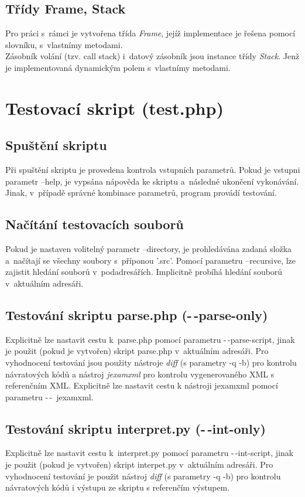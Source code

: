 \documentclass[a4paper, 10pt]{article}
\begin{document}
\subsection{Třídy Frame, Stack}
\qquad Pro práci s~rámci je vytvořena třída \emph{Frame}, jejíž implementace je řešena pomocí slovníku, s~vlastnímy metodami. \\
Zásobník volání (tzv. call stack) i~datový zásobník jsou instance třídy \emph{Stack}. Jenž je implementovaná dynamickým polem s~vlastnímy metodami. 


\newpage

\section{Testovací skript (test.php)}

\subsection{Spuštění skriptu}
\qquad Při spuštění skriptu je provedena kontrola vstupních parametrů. Pokud je vstupni parametr  --help, je vypsána nápověda ke skriptu a~následné ukončení vykonávání. Jinak, v~případě správné kombinace parametrů, program provádí testování.

\subsection{Načítání testovacích souborů}
\qquad Pokud je nastaven volitelný parametr --directory, je prohledávána zadaná složka a~načítají se všechny soubory s~příponou '.src'. Pomocí parametru --recursive, lze zajistit hledání souborů v~podadresářích. Implicitně probíhá hledání souborů v~aktuálním adresáři. 

\subsection{Testování skriptu parse.php (-\,-parse-only)}
\qquad Explicitně lze nastavit cestu k~parse.php pomocí parametru -\,-parse-script, jinak je použit (pokud je vytvořen) skript parse.php v~aktuálním adresáři. \newline
Pro vyhodnocení testování jsou použity nástroje \emph{diff} (s parametry -q -b) pro kontrolu návratových kódů a nástroj \emph{jexamxml} pro kontrolu vygenerovaného XML s referenčním XML. Explicitně lze nastavit cestu k nástroji jexamxml pomocí parametru -\,-~jexamxml.


\subsection{Testování skriptu interpret.py (-\,-int-only)}
\qquad Explicitně lze nastavit cestu k~interpret.py pomocí parametru -\,-int-script, jinak je použit (pokud je vytvořen) skript interpet.py v~aktuálním adresáři. \newline
Pro vyhodnocení testování je použit nástroj \emph{diff} (s parametry -q -b) pro kontrolu návratových kódů i výstupu ze skriptu s referenčím výstupem.
\end{document}
